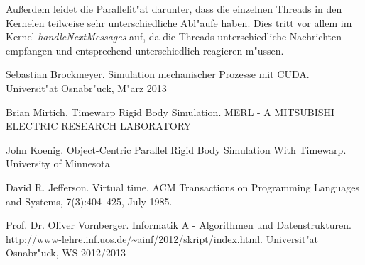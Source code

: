 \documentclass[a4paper, 10pt, openright, parskip, chapterprefix]{scrreprt}
\begin{document}
Au\ss erdem leidet die Parallelit"at darunter, dass die einzelnen Threads in den Kernelen teilweise sehr unterschiedliche Abl"aufe haben. Dies
tritt vor allem im Kernel \emph{handleNextMessages} auf, da die Threads unterschiedliche Nachrichten empfangen und entsprechend unterschiedlich
reagieren m"ussen.


\begin{thebibliography}{10}

Sebastian Brockmeyer. Simulation mechanischer Prozesse mit CUDA. Universit"at Osnabr"uck, M"arz 2013

Brian Mirtich. Timewarp Rigid Body Simulation. MERL - A MITSUBISHI ELECTRIC RESEARCH LABORATORY

John Koenig. Object-Centric Parallel Rigid Body Simulation With Timewarp. University of Minnesota

David R. Jefferson. Virtual time. ACM Transactions on Programming Languages and Systems, 7(3):404–425, July 1985.

Prof. Dr. Oliver Vornberger. Informatik A - Algorithmen und Datenstrukturen.
\url{http://www-lehre.inf.uos.de/~ainf/2012/skript/index.html}. Universit"at Osnabr"uck, WS 2012/2013
\end{thebibliography}
\end{document}
